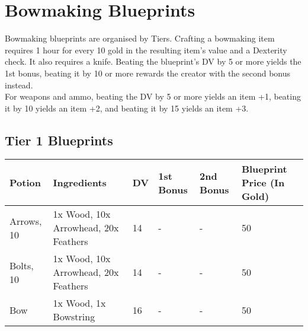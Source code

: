 \section{Bowmaking Blueprints}\label{sec:bowmakingBlueprints}
Bowmaking blueprints are organised by Tiers.
Crafting a bowmaking item requires 1 hour for every 10 gold in the resulting item's value and a Dexterity check.
It also requires a knife.
Beating the blueprint's DV by 5 or more yields the 1st bonus, beating it by 10 or more rewards the creator with the second bonus instead.\\
For weapons and ammo, beating the DV by 5 or more yields an item +1, beating it by 10 yields an item +2, and beating it by 15 yields an item +3.\\


\subsection{Tier 1 Blueprints}
\begin{longtable}{l | p{2.5cm} | l | p{1.5cm} | p{1.5cm} | p{1cm} }
	Potion & Ingredients & DV & 1st Bonus & 2nd Bonus & Blueprint Price (In Gold)\\ \hline
	Arrows, 10 & 1x Wood, 10x Arrowhead, 20x Feathers & 14 & - & - & 50\\
	Bolts, 10 & 1x Wood, 10x Arrowhead, 20x Feathers & 14 & - & - & 50\\
	Bow & 1x Wood, 1x Bowstring & 16 & - & - & 50\\
\end{longtable}